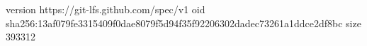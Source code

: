 version https://git-lfs.github.com/spec/v1
oid sha256:13af079fe3315409f0dae8079f5d94f35f92206302dadec73261a1ddce2df8bc
size 393312
